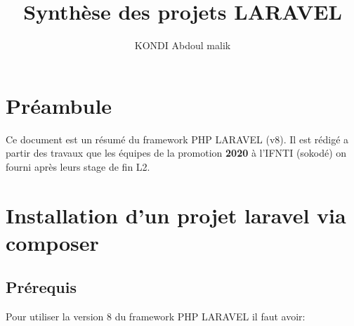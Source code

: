 \documentclass[12pt,a4paper]{article}
\author{KONDI Abdoul malik }
\title{Synthèse des projets LARAVEL}
\begin{document}
\maketitle
\tableofcontents
\newpage

\section{Préambule}
Ce document est un résumé du framework PHP LARAVEL (v8). Il est rédigé a partir des travaux
que les équipes de la promotion \textbf{2020} à l'IFNTI (sokodé) on fourni après leurs  stage de fin L2.\\




\newpage


\section{Installation d'un projet laravel via composer}


\subsection{Prérequis}
Pour utiliser la version 8 du framework PHP LARAVEL il faut avoir:
\end{document}
